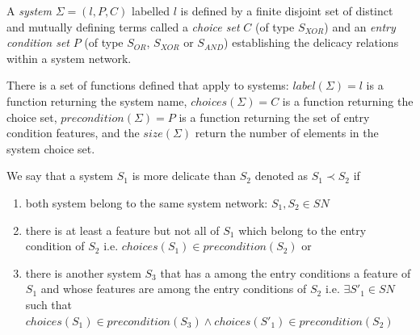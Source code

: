 \begin{definition}[System]\label{def:formal-system}
A \textit{system} $\Sigma=(l,P,C)$ labelled $l$ is defined by a finite disjoint set of distinct and mutually defining terms called a \textit{choice set} $C$ (of type $S_{XOR}$) and an \textit{entry condition set} $P$ (of type $S_{OR}$, $S_{XOR}$ or $S_{AND}$) establishing the delicacy relations within a system network.
\end{definition}

There is a set of functions defined that apply to systems: $label(\Sigma)=l$ is a function returning the system name, $choices(\Sigma)=C$ is a function returning the choice set, $precondition(\Sigma)=P$ is a function returning the set of entry condition features, and the $size(\Sigma)$ return the number of elements in the system choice set.  

\begin{definition}\label{def:delicacy-hierarchy}
	We say that a system $S_{1}$ is more delicate than $S_{2}$ denoted as $S_{1} \prec S_{2}$ if 
	\begin{enumerate}
		\item both system belong to the same system network: $S_{1}, S_{2} \in SN$ 
		\item there is at least a feature but not all of $S_{1}$ which belong to the entry condition of $S_{2}$ i.e. $choices(S_{1}) \in precondition(S_{2})$ or
        \item there is another system $S_{3}$ that has a among the entry conditions a feature of $S_1$ and whose features are among the entry conditions of $S_{2}$ i.e. $ \exists S'_{1} \in SN$ such that $ choices(S_{1}) \in precondition(S_{3}) \land choices(S'_{1}) \in precondition(S_{2})$
	\end{enumerate} 
\end{definition}

